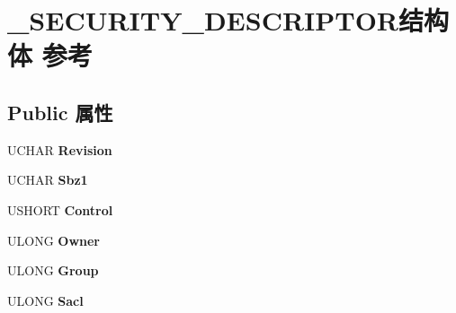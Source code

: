 \hypertarget{struct___s_e_c_u_r_i_t_y___d_e_s_c_r_i_p_t_o_r}{}\section{\+\_\+\+S\+E\+C\+U\+R\+I\+T\+Y\+\_\+\+D\+E\+S\+C\+R\+I\+P\+T\+O\+R结构体 参考}
\label{struct___s_e_c_u_r_i_t_y___d_e_s_c_r_i_p_t_o_r}
\subsection*{Public 属性}
\begin{DoxyCompactItemize}
\item 
\mbox{\label{struct___s_e_c_u_r_i_t_y___d_e_s_c_r_i_p_t_o_r_a04d07191f19edda54e63353837a588a7}} 
U\+C\+H\+AR {\bfseries Revision}
\item 
\mbox{\label{struct___s_e_c_u_r_i_t_y___d_e_s_c_r_i_p_t_o_r_a4e7f873aebc6462ff1e07b387b11c782}} 
U\+C\+H\+AR {\bfseries Sbz1}
\item 
\mbox{\label{struct___s_e_c_u_r_i_t_y___d_e_s_c_r_i_p_t_o_r_a21af550966c14d0d2b1bf30db6ef51fe}} 
U\+S\+H\+O\+RT {\bfseries Control}
\item 
\mbox{\label{struct___s_e_c_u_r_i_t_y___d_e_s_c_r_i_p_t_o_r_a882bfc53efa038f4b9fa144a50fb755f}} 
U\+L\+O\+NG {\bfseries Owner}
\item 
\mbox{\label{struct___s_e_c_u_r_i_t_y___d_e_s_c_r_i_p_t_o_r_a076ecea0492ee712cf2be9c199dd00df}} 
U\+L\+O\+NG {\bfseries Group}
\item 
\mbox{\label{struct___s_e_c_u_r_i_t_y___d_e_s_c_r_i_p_t_o_r_a85a851bde8e36138704258aac0a70bb8}} 
U\+L\+O\+NG {\bfseries Sacl}
\item 
\mbox{\label{struct___s_e_c_u_r_i_t_y___d_e_s_c_r_i_p_t_o_r_ad6acd62fd569fff1c4e8720fec2b1d09}} 

\end{DoxyCompactItemize}
